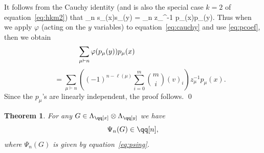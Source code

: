 \documentclass[12pt]{article}
\newtheorem{theorem}{Theorem}[section]
\theoremstyle{definition}
\theoremstyle{remark}
\begin{document}
It follows from the Cauchy identity \cite[Thm.~7.12.1]{ec2} (and is
also the special case $k=2$ of equation~\eqref{eq:hkm2}) that
  \beq \sum_{\lambda\vdash n} s_\lambda(x)s_\lambda(y) =
     \sum_{\mu\vdash n} z_\mu^{-1} p_\mu(x)p_\mu(y). 
    \label{eq:cauchy} \eeq
Thus when we apply $\varphi$ (acting on the $y$ variables) to
equation~\eqref{eq:cauchy} and use \eqref{eq:pcoef}, then we obtain
  $$ \hspace{-1in} \sum_{\mu\vdash n} \varphi(p_\mu(y))p_\mu(x) $$ 
   $$ \qquad =
    \sum_{\mu\vdash n} \left((-1)^{n-\ell(\mu)}
    \sum_{i=0}^m \binom mi (v)_i\right) z_\mu^{-1}
     p_\mu(x). $$
Since the $p_\mu$'s are linearly independent, the proof follows.
\qed


\begin{theorem} \label{thm:sp}
For any $G\in\Lambda_\qq[x]\otimes \Lambda_\qq[y]$ we have 
  $$ \Psi_n(G) \in \qq[n], $$
where $\Psi_n(G)$ is given by equation~\eqref{eq:psing}.
\end{theorem}
\end{document}
